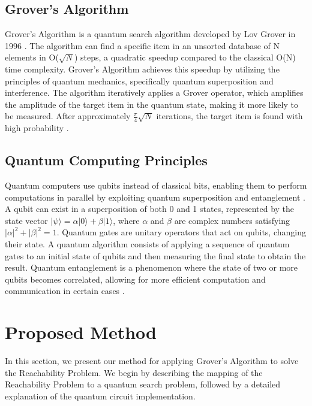 \subsection{Grover's Algorithm}

Grover's Algorithm is a quantum search algorithm developed by Lov Grover in 1996 \cite{grover1996fast}. The algorithm can find a specific item in an unsorted database of N elements in O($\sqrt{N}$) steps, a quadratic speedup compared to the classical O(N) time complexity. Grover's Algorithm achieves this speedup by utilizing the principles of quantum mechanics, specifically quantum superposition and interference. The algorithm iteratively applies a Grover operator, which amplifies the amplitude of the target item in the quantum state, making it more likely to be measured. After approximately $\frac{\pi}{4}\sqrt{N}$ iterations, the target item is found with high probability \cite{nielsen2010quantum}.

\subsection{Quantum Computing Principles}

Quantum computers use qubits instead of classical bits, enabling them to perform computations in parallel by exploiting quantum superposition and entanglement \cite{nielsen2010quantum}. A qubit can exist in a superposition of both 0 and 1 states, represented by the state vector $|\psi\rangle = \alpha|0\rangle + \beta|1\rangle$, where $\alpha$ and $\beta$ are complex numbers satisfying $|\alpha|^2 + |\beta|^2 = 1$. Quantum gates are unitary operators that act on qubits, changing their state. A quantum algorithm consists of applying a sequence of quantum gates to an initial state of qubits and then measuring the final state to obtain the result. Quantum entanglement is a phenomenon where the state of two or more qubits becomes correlated, allowing for more efficient computation and communication in certain cases \cite{nielsen2010quantum}.

\section{Proposed Method}
\label{sec:method}

In this section, we present our method for applying Grover's Algorithm to solve the Reachability Problem. We begin by describing the mapping of the Reachability Problem to a quantum search problem, followed by a detailed explanation of the quantum circuit implementation.


